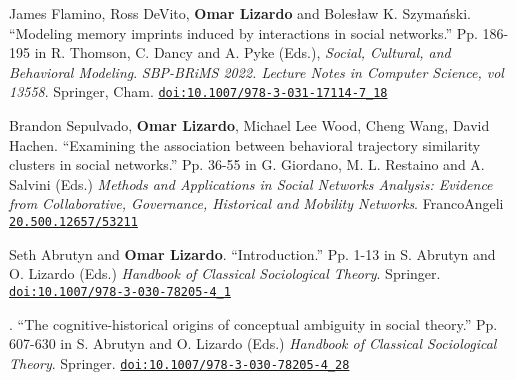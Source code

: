


\ind James Flamino, Ross DeVito, {\bf Omar Lizardo} and Boles\l{}aw K. Szyma\'{n}ski. ``Modeling memory imprints induced by interactions in social networks.'' Pp. 186-195 in R. Thomson, C. Dancy and A. Pyke (Eds.), {\em Social, Cultural, and Behavioral Modeling}. {\em SBP-BRiMS 2022. Lecture Notes in Computer Science, vol 13558}. Springer, Cham. \href{https://doi.org/10.1007/978-3-031-17114-7_18}{\nolinkurl{doi:10.1007/978-3-031-17114-7_18}}

\ind Brandon Sepulvado, {\bf Omar Lizardo}, Michael Lee Wood, Cheng Wang, David Hachen. ``Examining the association between behavioral trajectory similarity clusters in social networks.'' Pp. 36-55 in G. Giordano, M. L. Restaino and A. Salvini (Eds.)  {\em Methods and Applications in Social Networks Analysis: Evidence from Collaborative, Governance, Historical and Mobility Networks}. FrancoAngeli \href{https://library.oapen.org/handle/20.500.12657/53211}{\nolinkurl{20.500.12657/53211}}

\ind Seth Abrutyn and {\bf Omar Lizardo}. ``Introduction.'' Pp. 1-13 in S. Abrutyn and O. Lizardo (Eds.) {\em Handbook of Classical Sociological Theory}. Springer. \href{https://doi.org/10.1007/978-3-030-78205-4_1}{\nolinkurl{doi:10.1007/978-3-030-78205-4_1}}

. ``The cognitive-historical origins of conceptual ambiguity in social theory.'' Pp. 607-630 in S. Abrutyn and O. Lizardo (Eds.) {\em Handbook of Classical Sociological Theory}. Springer. \href{https://doi.org/10.1007/978-3-030-78205-4_28}{\nolinkurl{doi:10.1007/978-3-030-78205-4_28}}
